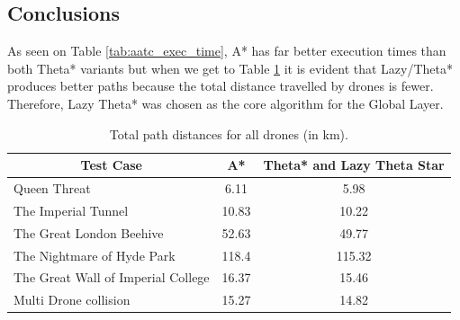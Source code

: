 \documentclass[a4paper,11pt,titlepage]{report}
\begin{document}
\subsection{Conclusions}
As seen on Table \ref{tab:aatc_exec_time}, A* has far better execution times than both Theta* variants but when we get to Table \ref{tab:aatc_total_drone_distance} it is evident that Lazy/Theta* produces better paths because the total distance travelled by drones is fewer. Therefore, Lazy Theta* was chosen as the core algorithm for the Global Layer.

\begin{table}[!hbpt]
\centering
\begin{tabular}{|l|c|c|}
\hline
\multicolumn{1}{|c|}{Test Case} & A* & \multicolumn{1}{l|}{Theta* and Lazy Theta Star} \\ \hline
Queen Threat & 6.11 & 5.98 \\ \hline
The Imperial Tunnel & 10.83 & 10.22 \\ \hline
The Great London Beehive & 52.63 & 49.77 \\ \hline
The Nightmare of Hyde Park & 118.4 & 115.32 \\ \hline
The Great Wall of Imperial College & 16.37 & 15.46 \\ \hline
Multi Drone collision & 15.27 & 14.82 \\ \hline
\end{tabular}
\caption{Total path distances for all drones (in km). \cite{Balaji2017}}
\label{tab:aatc_total_drone_distance}
\end{table}
\end{document}
